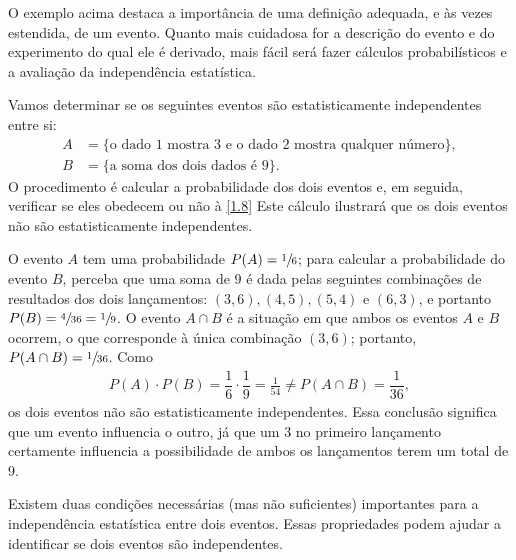 O exemplo acima destaca a importância de uma definição adequada, e às vezes estendida, de um evento. Quanto mais cuidadosa for a descrição do evento e do experimento do qual ele é derivado, mais fácil será fazer cálculos probabilísticos e a avaliação da independência estatística.

\begin{exemplo}{}{}
Vamos determinar se os seguintes eventos são estatisticamente independentes entre si:
\begin{align*}
	A &= \{ \text{o dado 1 mostra 3 e o dado 2 mostra qualquer número} \},  \\
	B &=  \{ \text{a soma dos dois dados é 9} \}.
\end{align*}
O procedimento é calcular a probabilidade dos dois eventos e, em seguida, verificar se eles obedecem ou não à \autoref{1.8} Este cálculo ilustrará que os dois eventos não são estatisticamente independentes.

O evento $A$ tem uma probabilidade $P(A) = \sfrac{1}{6}$; para calcular a probabilidade do evento $B$, perceba que uma soma de 9 é dada pelas seguintes combinações de resultados dos dois lançamentos: $(3,6), (4,5), (5,4)$ e $(6,3)$, e portanto $P(B) = \sfrac{4}{36} = \sfrac{1}{9}$. O evento $A \cap B$ é a situação em que ambos os eventos $A$ e $B$ ocorrem, o que corresponde à única combinação $(3,6)$; portanto, $P(A \cap B) = \sfrac{1}{36}$. Como
\begin{align*}
	P(A) \cdot P(B) = \dfrac{1}{6} \cdot \dfrac{1}{9} = \frac{1}{54} \neq P(A \cap B) = \dfrac{1}{36},
\end{align*}
os dois eventos não são estatisticamente independentes. Essa conclusão significa que um evento influencia o outro, já que um 3 no primeiro lançamento certamente influencia a possibilidade de ambos os lançamentos terem um total de 9. 
\end{exemplo}

Existem duas condições necessárias (mas não suficientes) importantes para a independência estatística entre dois eventos. Essas propriedades podem ajudar a identificar se dois eventos são independentes.


